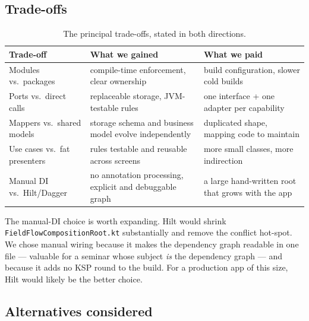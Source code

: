 \documentclass[11pt,a4paper]{article}
\newcommand{\file}[1]{{\small\texttt{#1}}}
\begin{document}
\subsection{Trade-offs}

\begin{table}[H]
\centering
\small
\begin{tabularx}{\linewidth}{@{}p{3.6cm} X X@{}}
\toprule
\textbf{Trade-off} & \textbf{What we gained} & \textbf{What we paid} \\
\midrule
Modules vs.\ packages     & compile-time enforcement, clear ownership & build configuration, slower cold builds \\
Ports vs.\ direct calls   & replaceable storage, JVM-testable rules & one interface + one adapter per capability \\
Mappers vs.\ shared models& storage schema and business model evolve independently & duplicated shape, mapping code to maintain \\
Use cases vs.\ fat presenters & rules testable and reusable across screens & more small classes, more indirection \\
Manual DI vs.\ Hilt/Dagger& no annotation processing, explicit and debuggable graph & a large hand-written root that grows with the app \\
\bottomrule
\end{tabularx}
\caption{The principal trade-offs, stated in both directions.}
\end{table}

The manual-DI choice is worth expanding. Hilt would shrink
\file{FieldFlowCompositionRoot.kt} substantially and remove the conflict
hot-spot. We chose manual wiring because it makes the dependency graph readable
in one file --- valuable for a seminar whose subject \emph{is} the dependency
graph --- and because it adds no KSP round to the build. For a production app of
this size, Hilt would likely be the better choice.

\subsection{Alternatives considered}
\end{document}
